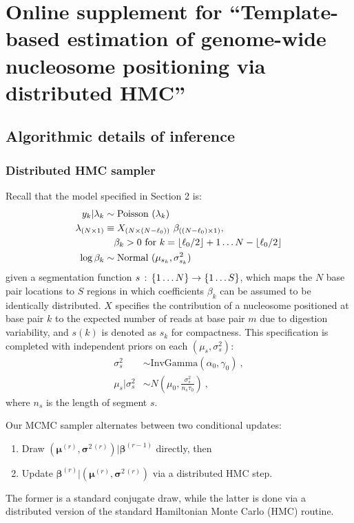 
\chapter{Online supplement for ``Template-based estimation of genome-wide nucleosome positioning via distributed HMC''}

\section{Algorithmic details of inference}

\subsection{Distributed HMC sampler}
\label{sec:mcmc}

Recall that the model specified in Section 2 is:
\begin{align}
 \label{eq:observation_model}
  y_k|\lambda_k         & \sim \hbox{Poisson } (\lambda_k) \\
 \label{eq:linear_model}
  \lambda_{(N\times 1)} & \equiv X_{(N\times (N - \ell_0))} ~ \beta_{((N - \ell_0)\times 1)}, \\
\nonumber & \quad \beta_k>0 \hbox{ for } k=\lfloor \ell_0 / 2 \rfloor + 1 \dots N - \lfloor \ell_0 / 2 \rfloor \\
\label{eq:positioning_model}
  \log \beta_k        & \sim \hbox{Normal } (\mu_{s_k},\sigma^2_{s_k})
\end{align}
given a segmentation function $s \,:\, \left\{1 \ldots N\right\} \rightarrow \left\{1 \ldots S\right\}$, which maps the $N$ base pair locations to $S$ regions in which coefficients $\beta_k$ can be assumed to be identically distributed.
$X$ specifies the contribution of a nucleosome positioned at base pair $k$ to the expected number of reads at base pair $m$ due to digestion variability, and $s(k)$ is denoted as $s_k$ for compactness.
This specification is completed with independent priors on each $(\mu_s, \sigma^2_s)$:
\begin{align}
\sigma^2_{s} &\sim \mathrm{InvGamma}(\alpha_0, \gamma_0) \ , \\
\mu_{s} | \sigma^2_{s} &\sim N(\mu_0, \frac{\sigma^2_{s}}{n_{s} \tau_0}) \ ,
\end{align}
where $n_{s}$ is the length of segment $s$.

Our MCMC sampler alternates between two conditional updates:
\begin{enumerate}
 \item Draw $(\bm \mu^{(r)}, \bm \sigma^{2\,(r)}) | \bm \beta^{(r-1)}$ directly, then
 \item Update $\bm \beta^{(r)} | (\bm \mu^{(r)}, \bm \sigma^{2\,(r)})$ via a distributed HMC step.
\end{enumerate}
The former is a standard conjugate draw, while the latter is done via a distributed version of the standard Hamiltonian Monte Carlo (HMC) routine.

